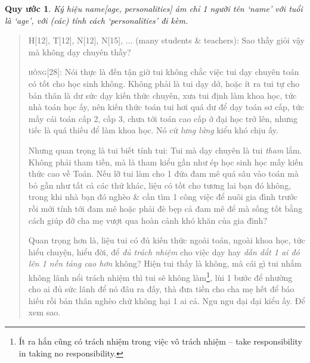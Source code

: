 \documentclass[12pt]{article}
\newtheorem{quyuoc}{Quy ước}
\begin{document}
\begin{quyuoc}
	Ký hiệu {\rm name[age, personalities]} ám chỉ 1 người tên `name' với tuổi là `age', với (các) tính cách `personalities' đi kèm.
\end{quyuoc}

\begin{quotation}
	H[12], T[12], N[12], N[15], $\ldots$ (many students \& teachers): Sao thầy giỏi vậy mà không dạy chuyên thầy?
	\vspace{2mm}
	
	\textsc{hồng[28]}: Nói thực là đến tận giờ tui không chắc việc tui dạy chuyên toán có tốt cho học sinh không. Không phải là tui dạy dở, hoặc ít ra tui tự cho bản thân là dư sức dạy kiến thức chuyên, xưa tui định làm khoa học, tức nhà toán học ấy, nên kiến thức toán tui hơi quá dư để dạy toán sơ cấp, tức mấy cái toán cấp 2, cấp 3, chưa tới toán cao cấp ở đại học trở lên, nhưng tiếc là quá thiếu để làm khoa học. Nó cứ {\it lưng lửng} kiểu khó chịu ấy.
	
	Nhưng quan trọng là tui biết tính tui: Tui mà dạy chuyên là tui {\it tham} lắm. Không phải tham tiền, mà là tham kiểu gần như ép học sinh học mấy kiến thức cao về Toán. Nếu lỡ tui làm cho 1 đứa đam mê quá sâu vào toán mà bỏ gần như tất cả các thứ khác, liệu có tốt cho tương lai bạn đó không, trong khi nhà bạn đó nghèo \& cần tìm 1 công việc để nuôi gia đình trước rồi mới tính tới đam mê hoặc phải đè bẹp cả đam mê để mà sống tốt bằng cách giúp đỡ cha mẹ vượt qua hoàn cảnh khó khăn của gia đình?
	
	Quan trọng hơn là, liệu tui có đủ kiến thức ngoài toán, ngoài khoa học, tức hiểu chuyện, hiểu đời, để {\it đủ trách nhiệm} cho việc dạy hay {\it dẫn dắt 1 ai đó lên 1 nền tảng cao hơn} không? Hiện tui thấy là không, mà cái gì tui nhắm không lãnh nổi trách nhiệm thì tui sẽ không làm\footnote{Ít ra hắn cũng có trách nhiệm trong việc vô trách nhiệm -- take responsibility in taking no responsibility.}, lùi 1 bước để nhường cho ai đủ sức lãnh để nó đâu ra đấy, thà đưa tiền cho cha mẹ hết để báo hiếu rồi bản thân nghèo chứ không hại 1 ai cả. Ngu ngu dại dại kiểu ấy. Để xem sao.
\end{quotation}
\end{document}
